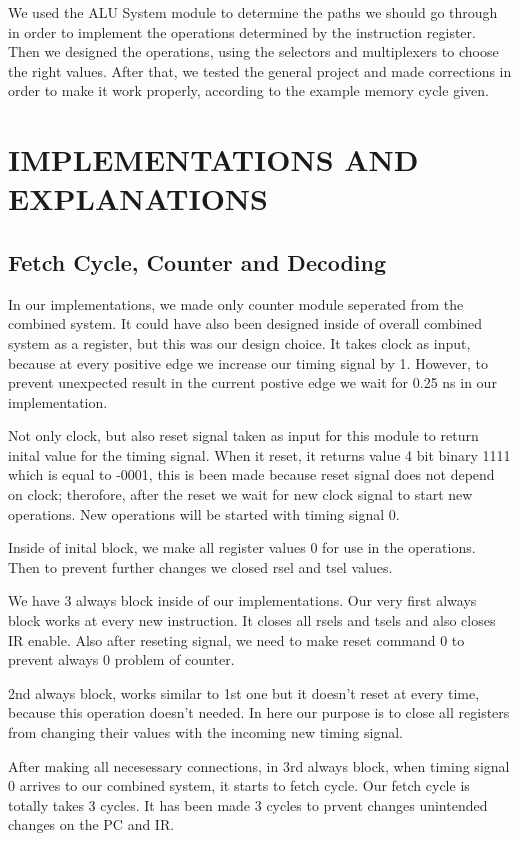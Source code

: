 \documentclass[pdftex,12pt,a4paper]{article}
\begin{document}
We used the ALU System module to determine the paths we should go through in order to implement the operations 
determined by the instruction register. Then we designed the operations, using the selectors and multiplexers to choose
the right values. After that, we tested the general project and made corrections in order to make it work properly, 
according to the example memory cycle given. 

\section{IMPLEMENTATIONS AND EXPLANATIONS }
\subsection{Fetch Cycle, Counter and Decoding}
In our implementations, we made only counter module seperated from the 
combined system. It could have also been designed inside of overall 
combined system as a register, but this was our design choice. It takes 
clock as input, because at every positive edge we increase our timing signal
by 1. However, to prevent unexpected result in the current postive edge we wait for
0.25 ns in our implementation.

Not only clock, but also reset signal taken as input for this module
to return inital value for the timing signal. When it reset, it returns value 4 bit
binary 1111 which is equal to -0001, this is been made because reset signal 
does not depend on clock; therofore, after the reset we wait for new clock signal 
to start new operations. New operations will be started with timing signal 0.

Inside of inital block, we make all register values 0 for use in the operations.
Then to prevent further changes we closed rsel and tsel values.

We have 3 always block inside of our implementations. Our very first always
 block works at every new instruction. It closes all rsels and tsels and also
 closes IR enable. Also after reseting signal, we need to make reset command
 0 to prevent always 0 problem of counter.

2nd always block, works similar to 1st one but it doesn't reset at every time,
because this operation doesn't needed. In here our purpose is to close all
registers from changing their values with the incoming new timing signal.


After making all necesessary connections, in 3rd always block, when timing signal 0 
arrives to our combined system, it starts to fetch cycle. Our 
fetch cycle is totally takes 3 cycles. It has been made 3 cycles to prvent 
changes unintended changes on the PC and IR.
\end{document}
